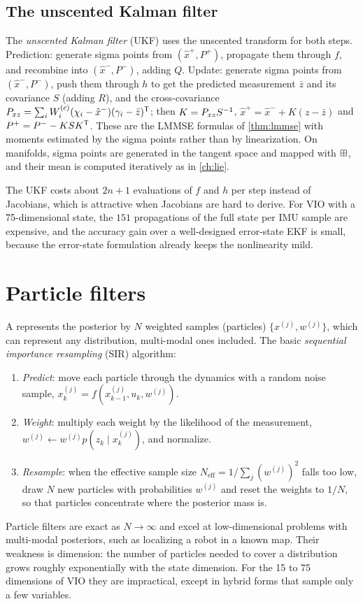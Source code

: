 \subsection{The unscented Kalman filter}

The \emph{unscented Kalman filter} (UKF) uses the unscented transform for both steps. Prediction: generate sigma points from $(\hat x^+, P^+)$, propagate them
through $f$, and recombine into $(\hat x^-, P^-)$, adding $Q$. Update: generate sigma points from $(\hat x^-, P^-)$, push them through $h$ to get the predicted
measurement $\bar z$ and its covariance $S$ (adding $R$), and the cross-covariance $P_{xz} = \sum_iW_i^{(c)}(\chi_i - \hat x^-)(\gamma_i - \bar z)^{\mathsf{T}}$; then
$K = P_{xz}S^{-1}$, $\hat x^+ = \hat x^- + K(z - \bar z)$ and $P^+ = P^- - KSK^{\mathsf{T}}$. These are the LMMSE formulas of \cref{thm:lmmse} with moments estimated by the
sigma points rather than by linearization. On manifolds, sigma points are generated in the tangent space and mapped with $\boxplus$, and their mean is
computed iteratively as in \cref{ch:lie}.

The UKF costs about $2n + 1$ evaluations of $f$ and $h$ per step instead of Jacobians, which is attractive when Jacobians are hard to derive. For VIO
with a 75-dimensional state, the $151$ propagations of the full state per IMU sample are expensive, and the accuracy gain over a well-designed
error-state EKF is small, because the error-state formulation already keeps the nonlinearity mild.

\section{Particle filters}

A  represents the posterior by $N$ weighted samples (particles) $\{x^{(j)}, w^{(j)}\}$, which can represent any distribution,
multi-modal ones included. The basic \emph{sequential importance resampling} (SIR) algorithm:
\begin{enumerate}
  \item \emph{Predict}: move each particle through the dynamics with a random noise sample, $x_k^{(j)} = f(x_{k-1}^{(j)}, u_k, w^{(j)})$.
  \item \emph{Weight}: multiply each weight by the likelihood of the measurement, $w^{(j)} \gets w^{(j)}p(z_k\mid x_k^{(j)})$, and normalize.
  \item \emph{Resample}: when the effective sample size $N_{\mathrm{eff}} = 1/\sum_j(w^{(j)})^2$ falls too low, draw $N$ new particles with probabilities $w^{(j)}$ and
        reset the weights to $1/N$, so that particles concentrate where the posterior mass is.
\end{enumerate}
Particle filters are exact as $N\to\infty$ and excel at low-dimensional problems with multi-modal posteriors, such as localizing a robot in a known
map. Their weakness is dimension: the number of particles needed to cover a distribution grows roughly exponentially with the state dimension.
For the 15 to 75 dimensions of VIO they are impractical, except in hybrid forms that sample only a few variables.


